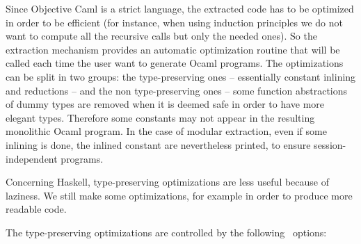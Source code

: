 
Since Objective Caml is a strict language, the extracted code has to
be optimized in order to be efficient (for instance, when using
induction principles we do not want to compute all the recursive calls
but only the needed ones). So the extraction mechanism provides an
automatic optimization routine that will be called each time the user
want to generate Ocaml programs. The optimizations can be split in two
groups: the type-preserving ones -- essentially constant inlining and
reductions -- and the non type-preserving ones -- some function
abstractions of dummy types are removed when it is deemed safe in order
to have more elegant types. Therefore some constants may not appear in the
resulting monolithic Ocaml program. In the case of modular extraction,
even if some inlining is done, the inlined constant are nevertheless
printed, to ensure session-independent programs.

Concerning Haskell, type-preserving optimizations are less useful
because of laziness. We still make some optimizations, for example in
order to produce more readable code.

The type-preserving optimizations are controlled by the following \Coq\ options:

